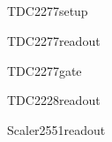 \subsection{}

\begin{procdesc}{TDC2277setup}{}
\end{procdesc}

\begin{procdesc}{TDC2277readout}{}
\end{procdesc}

\begin{procdesc}{TDC2277gate}{}
\end{procdesc}

\begin{procdesc}{TDC2228readout}{}
\end{procdesc}

\begin{procdesc}{Scaler2551readout}{}
\end{procdesc}

